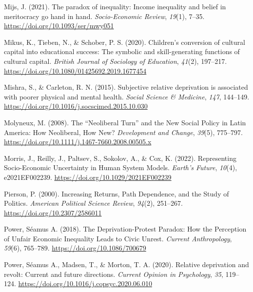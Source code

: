 \documentclass[
  letterpaper,
  DIV=11,
  numbers=noendperiod]{scrartcl}
\newlength{\cslhangindent}
\newlength{\cslentryspacingunit} %
\newenvironment{CSLReferences}[2] %
 {%
  \setlength{\parindent}{0pt}
  \ifodd #1
  \let\oldpar\par
  \def\par{\hangindent=\cslhangindent\oldpar}
  \fi
  \setlength{\parskip}{#2\cslentryspacingunit}
 }%
 {}
\begin{document}
\begin{CSLReferences}{1}{0}
\leavevmode{}%
Mijs, J. (2021). The paradox of inequality: Income inequality and belief
in meritocracy go hand in hand. \emph{Socio-Economic Review},
\emph{19}(1), 7--35. \url{https://doi.org/10.1093/ser/mwy051}

\leavevmode{}%
Mikus, K., Tieben, N., \& Schober, P. S. (2020). Children's conversion
of cultural capital into educational success: The symbolic and
skill-generating functions of cultural capital. \emph{British Journal of
Sociology of Education}, \emph{41}(2), 197--217.
\url{https://doi.org/10.1080/01425692.2019.1677454}

\leavevmode{}%
Mishra, S., \& Carleton, R. N. (2015). Subjective relative deprivation
is associated with poorer physical and mental health. \emph{Social
Science \& Medicine}, \emph{147}, 144--149.
\url{https://doi.org/10.1016/j.socscimed.2015.10.030}

\leavevmode{}%
Molyneux, M. (2008). The {``{Neoliberal Turn}''} and the {New Social
Policy} in {Latin America}: {How Neoliberal}, {How New}?
\emph{Development and Change}, \emph{39}(5), 775--797.
\url{https://doi.org/10.1111/j.1467-7660.2008.00505.x}

\leavevmode{}%
Morris, J., Reilly, J., Paltsev, S., Sokolov, A., \& Cox, K. (2022).
Representing {Socio}-{Economic Uncertainty} in {Human System Models}.
\emph{Earth's Future}, \emph{10}(4), e2021EF002239.
\url{https://doi.org/10.1029/2021EF002239}

\leavevmode{}%
Pierson, P. (2000). Increasing {Returns}, {Path Dependence}, and the
{Study} of {Politics}. \emph{American Political Science Review},
\emph{94}(2), 251--267. \url{https://doi.org/10.2307/2586011}

\leavevmode{}%
Power, Séamus A. (2018). The {Deprivation-Protest Paradox}: {How} the
{Perception} of {Unfair Economic Inequality Leads} to {Civic Unrest}.
\emph{Current Anthropology}, \emph{59}(6), 765--789.
\url{https://doi.org/10.1086/700679}

\leavevmode{}%
Power, Séamus A., Madsen, T., \& Morton, T. A. (2020). Relative
deprivation and revolt: Current and future directions. \emph{Current
Opinion in Psychology}, \emph{35}, 119--124.
\url{https://doi.org/10.1016/j.copsyc.2020.06.010}


\end{CSLReferences}
\end{document}
